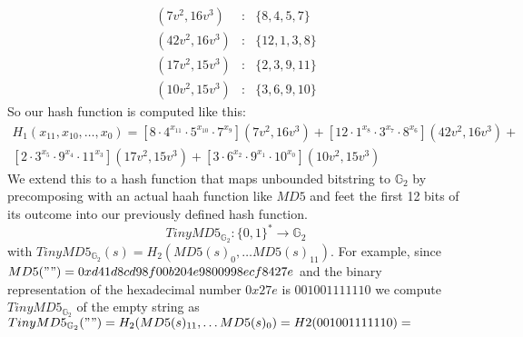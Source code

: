 $$
\begin{array}{lcl}
(7v^2 , 16v^3 ) &:& \{8,4,5,7\}\\
(42v^2 , 16v^3 ) &:& \{12,1,3,8\}\\
(17v^2 , 15v^3 ) &:& \{2,3,9,11\}\\
(10v^2 , 15v^3 ) &:& \{3,6,9,10\}
\end{array}
$$
So our hash function is computed like this:
\begin{multline*}
H_1(x_{11},x_{10},\ldots, x_{0})=
[8\cdot 4^{x_{11}}\cdot 5^{x_{10}}\cdot 7^{x_9}](7v^2 , 16v^3)+
[12\cdot 1^{x_8}\cdot 3^{x_7}\cdot 8^{x_6}](42v^2 , 16v^3 )+\\
[2\cdot 3^{x_5}\cdot 9^{x_4}\cdot 11^{x_3}](17v^2 , 15v^3 ) +
[3\cdot 6^{x_2}\cdot 9^{x_{1}}\cdot 10^{x_{0}}](10v^2 , 15v^3 )
\end{multline*}
We extend this to a hash function that maps unbounded bitstring to $\mathbb{G}_2$ by precomposing with an actual haah function like $MD5$ and feet the first 12 bits of its outcome into our previously defined hash function. 
$$
TinyMD5_{\mathbb{G}_2}: \{0,1\}^* \to \mathbb{G}_2
$$
with $TinyMD5_{\mathbb{G}_2}(s)= H_2(MD5(s)_0,\ldots MD5(s)_{11})$. For example, since 
$MD5("")= 0xd41d8cd98f00b204e9800998ecf8427e$ and the binary representation of the hexadecimal number $0x27e$ is $001001111110$ we compute $TinyMD5_{\mathbb{G}_2}$ of the empty string as
$TinyMD5_{\mathbb{G}_2}("")= H_2(MD5(s)_{11},\ldots MD5(s)_{0}) = H2(001001111110)=$






